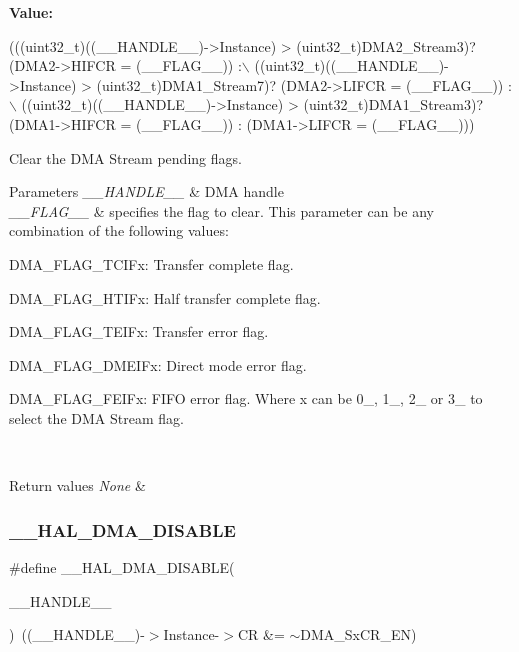 {\bfseries Value\+:}
\begin{DoxyCode}
(((uint32\_t)((\_\_HANDLE\_\_)->Instance) > (uint32\_t)DMA2\_Stream3)? (DMA2->HIFCR = (\_\_FLAG\_\_)) :\(\backslash\)
 ((uint32\_t)((\_\_HANDLE\_\_)->Instance) > (uint32\_t)DMA1\_Stream7)? (DMA2->LIFCR = (\_\_FLAG\_\_)) :\(\backslash\)
 ((uint32\_t)((\_\_HANDLE\_\_)->Instance) > (uint32\_t)DMA1\_Stream3)? (DMA1->HIFCR = (\_\_FLAG\_\_)) : (DMA1->LIFCR =
       (\_\_FLAG\_\_)))
\end{DoxyCode}


Clear the D\+MA Stream pending flags. 


\begin{DoxyParams}{Parameters}
{\em \+\_\+\+\_\+\+H\+A\+N\+D\+L\+E\+\_\+\+\_\+} & D\+MA handle \\
\hline
{\em \+\_\+\+\_\+\+F\+L\+A\+G\+\_\+\+\_\+} & specifies the flag to clear. This parameter can be any combination of the following values\+: \begin{DoxyItemize}
\item D\+M\+A\+\_\+\+F\+L\+A\+G\+\_\+\+T\+C\+I\+Fx\+: Transfer complete flag. \item D\+M\+A\+\_\+\+F\+L\+A\+G\+\_\+\+H\+T\+I\+Fx\+: Half transfer complete flag. \item D\+M\+A\+\_\+\+F\+L\+A\+G\+\_\+\+T\+E\+I\+Fx\+: Transfer error flag. \item D\+M\+A\+\_\+\+F\+L\+A\+G\+\_\+\+D\+M\+E\+I\+Fx\+: Direct mode error flag. \item D\+M\+A\+\_\+\+F\+L\+A\+G\+\_\+\+F\+E\+I\+Fx\+: F\+I\+FO error flag. Where x can be 0\+\_, 1\+\_, 2\+\_ or 3\+\_ to select the D\+MA Stream flag. ~\newline
\end{DoxyItemize}
\\
\hline
\end{DoxyParams}

\begin{DoxyRetVals}{Return values}
{\em None} & \\
\hline
\end{DoxyRetVals}
\mbox{\label{group___d_m_a_gafeef4c5e8c3f015cdecc0f37bbe063dc}} 
\subsubsection{\texorpdfstring{\+\_\+\+\_\+\+H\+A\+L\+\_\+\+D\+M\+A\+\_\+\+D\+I\+S\+A\+B\+LE}{\_\_HAL\_DMA\_DISABLE}}
{\footnotesize\ttfamily \#define \+\_\+\+\_\+\+H\+A\+L\+\_\+\+D\+M\+A\+\_\+\+D\+I\+S\+A\+B\+LE(\begin{DoxyParamCaption}\item[{}]{\+\_\+\+\_\+\+H\+A\+N\+D\+L\+E\+\_\+\+\_\+ }\end{DoxyParamCaption})~((\+\_\+\+\_\+\+H\+A\+N\+D\+L\+E\+\_\+\+\_\+)-\/$>$Instance-\/$>$CR \&=  $\sim$D\+M\+A\+\_\+\+Sx\+C\+R\+\_\+\+EN)}



